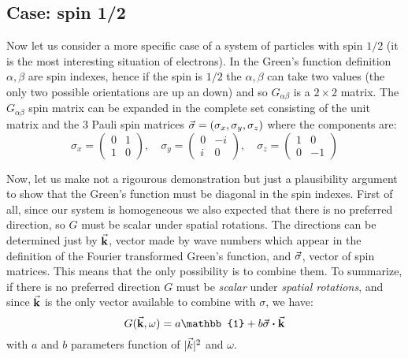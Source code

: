 \documentclass[../main/main.tex]{subfiles}
\begin{document}
\subsection{Case: spin 1/2}
Now let us consider a more specific case of a system of particles with spin \( 1/2 \) (it is the most interesting situation of electrons). 
 In the Green's function definition \( \alpha, \beta  \) are spin indexes, hence if the spin is \( 1/2 \) the \( \alpha ,\beta  \) can take two values (the only two possible orientations are up an down) and so \( G_{ \alpha \beta } \) is a \( 2 \times 2 \) matrix.
The \( G_{\alpha \beta } \) spin matrix can be expanded in the complete set consisting of the unit matrix and the 3 Pauli spin matrices \( \va{\sigma }= (\sigma _x, \sigma _y, \sigma _z)\) where the components are:
\begin{equation}
  \sigma _x = \begin{pmatrix}
  0   & 1 \\
  1   & 0
  \end{pmatrix}, \quad
  \sigma _y = \begin{pmatrix}
  0   & -i \\
  i   & 0
  \end{pmatrix}, \quad
  \sigma _z = \begin{pmatrix}
  1   & 0 \\
  0   & -1
  \end{pmatrix}
\end{equation}

Now, let us make not a rigourous demonstration but just a plausibility argument to show that the Green's function must be diagonal in the spin indexes.
First of all, since our system is homogeneous we also expected that there is no preferred direction, so \( G  \) must be scalar under spatial rotations.
The directions can be determined just by \( \va{k} \), vector made by wave numbers which appear in the definition of the Fourier transformed Green's function, and \( \va{\sigma } \), vector of spin matrices. This means that the only possibility is to combine them.
To summarize, if there is no preferred direction \( G \) must be \emph{scalar} under \emph{spatial rotations}, and since \( \va{k} \) is the only vector available to combine with \( \sigma  \), we have:
\begin{equation}
  G (\va{k}, \omega ) = a \mathbb{1} + b \va{\sigma } \vdot \va{k}
\end{equation}
with \( a \) and \( b \) parameters function of \( | \vec{k} |^2  \) and \( \omega  \).
\end{document}
